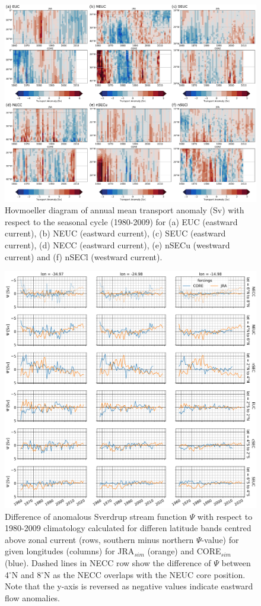 \documentclass[os, manuscript]{copernicus}
\begin{document}
\begin{figure}[t]
	\includegraphics[width=12cm]{../../figures/paper/f10_CURRENT_long_term.eps}
	\caption{Hovmoeller diagram of annual mean transport anomaly (Sv) with respect to the seasonal cycle (1980-2009) for (a) EUC (eastward current), (b) NEUC (eastward current), (c) SEUC (eastward current), (d) NECC (eastward current), (e) nSECu (westward current) and (f) nSECl (westward current).}
	\label{fig_current_long_term}
\end{figure} 


\begin{figure}[t]
	\includegraphics[width=12cm]{../../figures/paper/f11_INALT20_Sv_psi_ts_lat_bands.png}
	\caption{Difference of anomalous Sverdrup stream function $ \Psi $ with respect to 1980-2009 climatology calculated for differen latitude bands centred above zonal current (rows, southern minus northern $ \Psi $-value) for given longitudes (columns) for JRA$_{sim}$ (orange) and CORE$_{sim}$ (blue). Dashed lines in NECC row show the difference of $ \Psi $ between 4$^{\circ}$N and 8$^{\circ}$N as the NECC overlaps with the NEUC core position. Note that the y-axis is reversed as negative values indicate eastward flow anomalies.}
	\label{fig_SV_PSI_diff_ts_long_term}
\end{figure}
\end{document}
